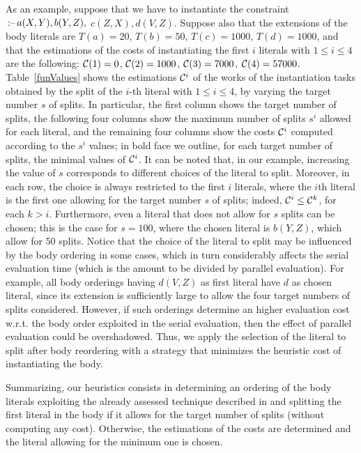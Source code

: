 \documentclass[preprint]{tlp}
\newcommand{\derives}{\ensuremath{\mbox{\,$:$--}\,}\xspace}
\begin{document}
As an example, suppose that we have to instantiate the constraint
$\derives a(X,Y), b(Y,Z),$ $c(Z,X), d(V,Z).$
Suppose also that the extensions of the body literals are $T(a)=20$, $T(b)=50$, $T(c)=1000$, $T(d)=1000$,
and that the estimations of the costs of instantiating the first $i$ literals with $1\leq i\leq 4$ are the following:
${\cal C}(1)= 0$, ${\cal C}(2)=1000$, ${\cal C}(3)=7000$, ${\cal C}(4)=57000$.
Table~\ref{funValues} shows the estimations ${\cal C}^i$ of the works
 of the instantiation tasks obtained by the split of the $i$-th literal
with $1\leq i\leq 4$, by varying the target number $s$ of splits. In particular, the first column shows the target
number of splits, the following four columns show the maximum number of splits $s^i$ allowed for each literal,
and the remaining four columns show the costs ${\cal C}^i$ computed according to the $s^i$ values;
in bold face we outline, for each target number of splits, the minimal values of ${\cal C}^i$.
It can be noted that, in our example, increasing the value of $s$
corresponds to different choices of the literal to split.
Moreover, in each row, the choice is always restricted to the first $i$ literals,
where the $i$th literal is the first one allowing for the target number $s$ of splits;
indeed, ${\cal C}^i \leq {\cal C}^k$, for each $k>i$. Furthermore, even a literal that
does not allow for $s$ splits can be chosen; this is the case for $s=100$, where the chosen
literal is $b(Y,Z)$, which allow for $50$ splits.
Notice that the choice of the literal to split may be influenced by the body ordering in some cases,
which in turn considerably affects the serial evaluation time (which is the amount to be divided by parallel evaluation).
For example, all body orderings having $d(V,Z)$ as first literal
have $d$ as chosen literal, since its extension is sufficiently large to allow
the four target numbers of splits considered. However, if such orderings
determine an higher evaluation cost w.r.t. the body order exploited in the serial evaluation,
then the effect of parallel evaluation could be overshadowed.
Thus, we apply the selection of the literal to split after body reordering
with a strategy that minimizes the heuristic cost of instantiating the body.

Summarizing, our heuristics consists in determining an ordering of the body literals
exploiting the already assessed technique described in \cite{leon-etal-2001a}
and splitting the first literal in the body if it allows for the target number of splits (without computing any cost).
Otherwise, the estimations of the costs are determined and the literal allowing for the minimum one is chosen.
\end{document}
